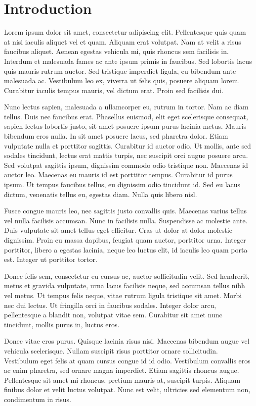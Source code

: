\documentclass{./styles/UoYCSproject}
\begin{document}
\chapter{Introduction}
\label{cha:Introduction}
Lorem ipsum dolor sit amet, consectetur adipiscing elit. Pellentesque quis quam at nisi iaculis aliquet vel et quam. Aliquam erat volutpat. Nam at velit a risus faucibus aliquet. Aenean egestas vehicula mi, quis rhoncus sem facilisis in. Interdum et malesuada fames ac ante ipsum primis in faucibus. Sed lobortis lacus quis mauris rutrum auctor. Sed tristique imperdiet ligula, eu bibendum ante malesuada ac. Vestibulum leo ex, viverra ut felis quis, posuere aliquam lorem. Curabitur iaculis tempus mauris, vel dictum erat. Proin sed facilisis dui.

Nunc lectus sapien, malesuada a ullamcorper eu, rutrum in tortor. Nam ac diam tellus. Duis nec faucibus erat. Phasellus euismod, elit eget scelerisque consequat, sapien lectus lobortis justo, sit amet posuere ipsum purus lacinia metus. Mauris bibendum eros nulla. In sit amet posuere lacus, sed pharetra dolor. Etiam vulputate nulla et porttitor sagittis. Curabitur id auctor odio. Ut mollis, ante sed sodales tincidunt, lectus erat mattis turpis, nec suscipit orci augue posuere arcu. Sed volutpat sagittis ipsum, dignissim commodo odio tristique non. Maecenas id auctor leo. Maecenas eu mauris id est porttitor tempus. Curabitur id purus ipsum. Ut tempus faucibus tellus, eu dignissim odio tincidunt id. Sed eu lacus dictum, venenatis tellus eu, egestas diam. Nulla quis libero nisl.

Fusce congue mauris leo, nec sagittis justo convallis quis. Maecenas varius tellus vel nulla facilisis accumsan. Nunc in facilisis nulla. Suspendisse ac molestie ante. Duis vulputate sit amet tellus eget efficitur. Cras ut dolor at dolor molestie dignissim. Proin eu massa dapibus, feugiat quam auctor, porttitor urna. Integer porttitor, libero a egestas lacinia, neque leo luctus elit, id iaculis leo quam porta est. Integer ut porttitor tortor.

Donec felis sem, consectetur eu cursus ac, auctor sollicitudin velit. Sed hendrerit, metus et gravida vulputate, urna lacus facilisis neque, sed accumsan tellus nibh vel metus. Ut tempus felis neque, vitae rutrum ligula tristique sit amet. Morbi nec dui lectus. Ut fringilla orci in faucibus sodales. Integer dolor arcu, pellentesque a blandit non, volutpat vitae sem. Curabitur sit amet nunc tincidunt, mollis purus in, luctus eros.

Donec vitae eros purus. Quisque lacinia risus nisi. Maecenas bibendum augue vel vehicula scelerisque. Nullam suscipit risus porttitor ornare sollicitudin. Vestibulum eget felis at quam cursus congue id id odio. Vestibulum convallis eros ac enim pharetra, sed ornare magna imperdiet. Etiam sagittis rhoncus augue. Pellentesque sit amet mi rhoncus, pretium mauris at, suscipit turpis. Aliquam finibus dolor et velit luctus volutpat. Nunc est velit, ultricies sed elementum non, condimentum in risus.
\end{document}
